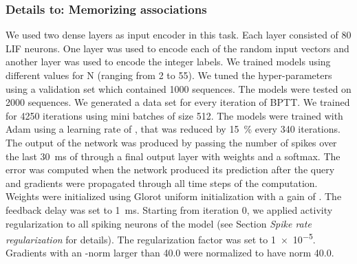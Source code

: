 \documentclass{article}
\begin{document}
\subsubsection*{Details to: Memorizing associations}
We used two dense layers as input encoder in this task. Each layer consisted of \num{80} \gls{LIF} neurons. One layer was used to encode each of the random input vectors and another layer was used to encode the integer labels. We trained models using different values for N (ranging from \num{2} to \num{55}). We tuned the hyper-parameters using a validation set which contained \num{1000} sequences. The models were tested on \num{2000} sequences. We generated a data set for every iteration of \gls{BPTT}. We trained for \num{4250} iterations using mini batches of size \num{512}. The models were trained with Adam \cite{kingma2014adam} using a learning rate of , that was reduced by \SI{15}{\percent} every \num{340} iterations. The output of the network was produced by passing the number of spikes over the last \SI{30}{ms} of  through a final output layer with weights  and a softmax. The error was computed when the network produced its prediction after the query and gradients were propagated through all time steps of the computation. Weights were initialized using Glorot uniform initialization \cite{glorot2010understanding} with a gain of . The feedback delay   was set to \SI{1}{ms}. Starting from iteration \num{0}, we applied  activity regularization to all spiking neurons of the model (see Section \emph{Spike rate regularization} for details). The regularization factor  was set to \num{1e-5}. Gradients with an -norm larger than \num{40.0} were normalized to have norm \num{40.0}.
\end{document}
